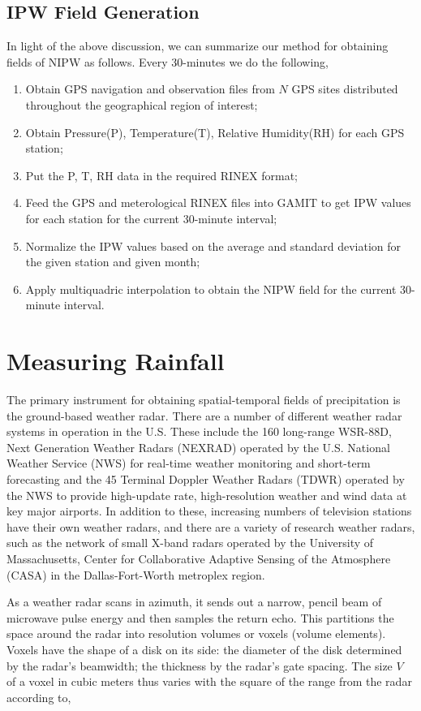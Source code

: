 \documentclass[proposal]{umassthesis}
\begin{document}
\subsection{IPW Field Generation}

In light of the above discussion, we can summarize our method for obtaining fields of NIPW as follows. Every 30-minutes we do the following,

\begin{enumerate}
\item Obtain GPS navigation and observation files from $N$ GPS sites distributed throughout the geographical region of interest;
\item Obtain Pressure(P), Temperature(T), Relative Humidity(RH) for each GPS station;
\item Put the P, T, RH data in the required RINEX format;
\item Feed the GPS and meterological RINEX files into GAMIT to get IPW values for each station for the current 30-minute interval;
\item Normalize the IPW values based on the average and standard deviation for the given station and given month;
\item Apply multiquadric interpolation to obtain the NIPW field for the current 30-minute interval.
\end{enumerate}

\section{Measuring Rainfall}

The primary instrument for obtaining spatial-temporal fields of precipitation is the ground-based weather radar. There are a number of different weather radar systems in operation in the U.S. These include the 160 long-range WSR-88D, Next Generation Weather Radars (NEXRAD) operated by the U.S. National Weather Service (NWS) for real-time weather monitoring and short-term forecasting and the 45 Terminal Doppler Weather Radars (TDWR) operated by the NWS to provide high-update rate, high-resolution weather and wind data at key major airports. In addition to these, increasing numbers of television stations have their own weather radars, and there are a variety of research weather radars, such as the network of small X-band radars operated by the University of Massachusetts, Center for Collaborative Adaptive Sensing of the Atmosphere (CASA) in the Dallas-Fort-Worth metroplex region.

As a weather radar scans in azimuth, it sends out a narrow, pencil beam of microwave pulse energy and then samples the return echo. This partitions the space around the radar into resolution volumes or voxels (volume elements). Voxels have the shape of a disk on its side: the diameter of the disk determined by the radar's beamwidth; the thickness by the radar's gate spacing. The size $V$ of a voxel in cubic meters thus varies with the square of the range from the radar according to,
\end{document}
